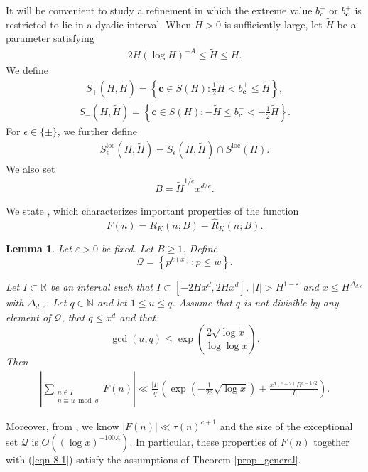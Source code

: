 \documentclass[reqno, 11pt]{amsart}
\renewcommand{\leq}{\leqslant}
\renewcommand{\geq}{\geqslant}
\newtheorem{lemma}[theorem]{Lemma}
\theoremstyle{definition}
\theoremstyle{definition}
\renewcommand{\geq}{\geqslant}
\renewcommand{\leq}{\leqslant}
\newcommand{\cc}{\mathbf{c}}
\numberwithin{equation}{section}
\begin{document}
It will be convenient to study a refinement in which the extreme value $b^-_\cc$ or $b^+_\cc$ is restricted to lie in a dyadic interval. When $H > 0$ is sufficiently large, let $\tilde{H}$ be a parameter satisfying
\begin{align}\label{def-tilde-H}
	2H(\log H)^{-A} \leq \tilde{H} \leq H.
\end{align}
We define
\begin{align}\label{def-StH}
	S_+(H, \tilde{H}) = \left\{ \cc \in S(H): \frac{1}{2}\tilde{H} < b^+_\cc \leq \tilde{H} \right\},
\end{align}
\begin{align}\label{def-StH-}
	S_-(H, \tilde{H}) = \left\{ \cc \in S(H): -\tilde{H} \leq b^-_\cc < -\frac{1}{2}\tilde{H} \right\}.
\end{align}
For $\epsilon \in \{\pm\}$, we further define
\begin{align*}
	S_\epsilon^{\mathrm{loc}}(H, \tilde{H}) = S_\epsilon(H, \tilde{H}) \cap S^{\mathrm{loc}}(H).
\end{align*}
We also set
\begin{align}\label{def-B}
	B = \tilde{H}^{1/e} x^{d/e}.
\end{align}


We state \cite[Lemma 8.2]{BST}, which characterizes important properties of the function 
$$F(n) = R_K(n; B) - \hat{R}_K(n; B).$$
\begin{lemma}\label{BST-Lemma-8.2}
Let $\varepsilon > 0$ be fixed. Let $B \geq 1$. Define
\begin{equation}\label{calQ}
\mathcal{Q} = \left\{ p^{k(x)} : p \leq w \right\}.
\end{equation}

Let $I \subset \mathbb{R}$ be an interval such that $I \subset [-2Hx^d, 2Hx^d]$, $|I| > H^{1 - \varepsilon}$ and $x \leq H^{\Delta_{d, e}}$ with $\Delta_{d, e}$. Let $q \in \mathbb{N}$ and let $1 \leq u \leq q$. \textit{Assume that $q$ is not divisible by any element of $\mathcal{Q}$, that $q \leq x^d$ and that}
\begin{equation*}
\gcd(u, q) \leq \exp\left( \frac{2 \sqrt{\log x}}{\log \log x} \right).
\end{equation*}
Then
\begin{align}\label{eqn-8.1}
	\left| \sum_{\substack{n \in I \\ n \equiv u \bmod q}} F(n) \right| 
\ll \frac{|I|}{q} \left( \exp\left( -\frac{1}{23} \sqrt{\log x} \right) + \frac{x^{d(e+2)} B^{e - 1/2}}{|I|} \right).
\end{align}


\end{lemma}
Moreover, from \cite[Section 8.1]{BST}, we know $|F(n)| \ll \tau(n)^{e+1}$ and the size of the exceptional set $\mathcal{Q}$ is $O((\log x)^{-100A})$.
In particular, these properties of \( F(n) \) together with (\ref{eqn-8.1}) satisfy the assumptions of Theorem \ref{prop_general}.
 
\end{document}
